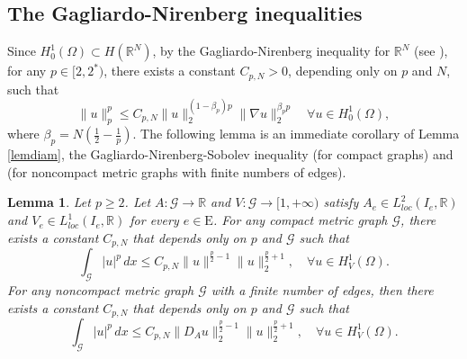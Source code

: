 \documentclass[11pt]{amsart}
\newtheorem{lemma}[theorem]{Lemma}
\newcommand{\abs}[1]{\lvert#1\rvert}
\newcommand{\norm}[1]{\lVert#1\rVert}
\newcommand{\G}{\mathcal{G}}
\newcommand{\R}{\mathbb{R}}
\numberwithin{equation}{section}
\begin{document}
\subsection{The Gagliardo-Nirenberg inequalities}
\label{subsecineq}
Since $H_0^1(\Omega)\subset H(\R^N)$, by the Gagliardo-Nirenberg inequality for  $\R^N$ (see \cite[Theorem 1.1]{Fio}),  for any  $p \in [2, 2^*)$, there exists a constant $C_{p,N}>0$, depending only on  $p$ and $N$, such that
\begin{equation}\label{eqgn}
    \|u\|_{p}^p \leq C_{p,N} \|u\|_{2}^{(1 - \beta_p)p} \|\nabla u\|_{2}^{\beta_p p} \quad \forall u \in  H_0^1(\Omega),
\end{equation}
where $\beta_p = N \left( \frac{1}{2} - \frac{1}{p} \right)$.
\iffalse
The following lemma is an immediate corollary of Lemma \ref{lemdiam}, the Gagliardo-Nirenberg-Sobolev inequality \cite[Theorem 1.1]{Ha2} (for compact graphs) and \cite[Section 2]{Adami} (for noncompact metric graphs with finite numbers of edges).
\begin{lemma}\label{lemgnsg}
Let $p \geq 2$. Let $A: \G \to \mathbb{R}$ and $V: \G \to [1, +\infty)$ satisfy $A_e \in L_{loc}^2(I_e,\R)$ and $V_e \in L_{loc}^1(I_e,\R)$ for every $e \in \mathrm{E}$. For any compact metric graph $\G$, there exists a constant $C_{p,N}$ that depends only on $p$ and $\G$ such that
\[
    \int_{\G} \abs{u}^p\,dx \leq C_{p,N} \norm{u}^{\frac{p}{2}-1}\norm{u}_2^{\frac{p}{2}+1}, \quad \forall u \in H^1_V(\Omega).
\]
For any noncompact metric graph $\G$ with a finite number of edges, then there exists a constant $C_{p,N}$ that depends only on $p$ and $\G$ such that
\[
 \int_{\G} \abs{u}^p\,dx \leq C_{p,N}  \norm{D_Au}^{\frac{p}{2}-1}_2\norm{u}_2^{\frac{p}{2}+1}, \quad \forall  u \in H^1_V(\Omega).
\]
\end{lemma}
\end{document}
